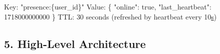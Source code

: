\documentclass[11pt]{article}
\newenvironment{Shaded}{\begin{snugshade}}{\end{snugshade}}
\newcommand{\DecValTok}[1]{\textcolor[rgb]{0.96,0.45,0.00}{#1}}
\newcommand{\ErrorTok}[1]{\textcolor[rgb]{0.85,0.27,0.33}{\underline{#1}}}
\newcommand{\NormalTok}[1]{\textcolor[rgb]{0.81,0.81,0.76}{#1}}
\newcommand{\SpecialCharTok}[1]{\textcolor[rgb]{0.24,0.68,0.91}{#1}}
\newcommand{\StringTok}[1]{\textcolor[rgb]{0.96,0.31,0.31}{#1}}
\begin{document}
\begin{Shaded}
\begin{Highlighting}[]
\NormalTok{Key:   }\StringTok{"presence:}\SpecialCharTok{\{user\_id\}}\StringTok{"}
\NormalTok{Value: \{ }\StringTok{"online"}\NormalTok{: true, }\StringTok{"last\_heartbeat"}\NormalTok{: }\DecValTok{1718000000000}\NormalTok{ \}}
\NormalTok{TTL:   }\DecValTok{30}\NormalTok{ seconds (refreshed by heartbeat every }\DecValTok{10}\ErrorTok{s}\NormalTok{)}
\end{Highlighting}
\end{Shaded}

\subsection{5. High-Level Architecture}\label{5-high-level-architecture-3}

\setcodelang{}
\end{document}
